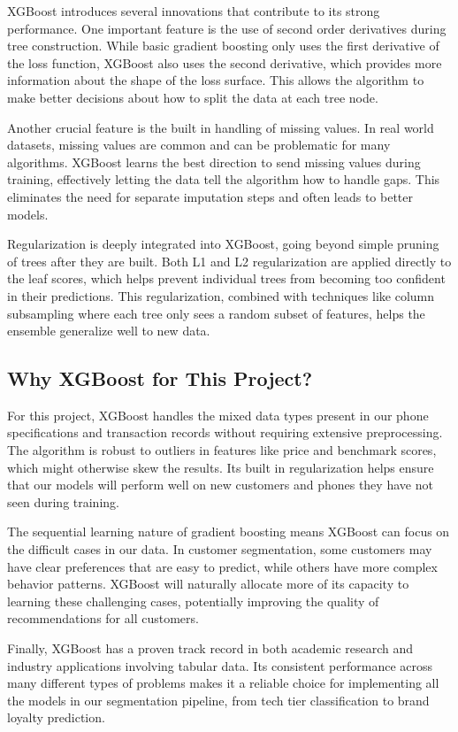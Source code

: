 \documentclass[12pt, a4paper]{report}
\numberwithin{equation}{chapter}
\begin{document}
XGBoost introduces several innovations that contribute to its strong performance. One important feature is the use of second order derivatives during tree construction. While basic gradient boosting only uses the first derivative of the loss function, XGBoost also uses the second derivative, which provides more information about the shape of the loss surface. This allows the algorithm to make better decisions about how to split the data at each tree node.

Another crucial feature is the built in handling of missing values. In real world datasets, missing values are common and can be problematic for many algorithms. XGBoost learns the best direction to send missing values during training, effectively letting the data tell the algorithm how to handle gaps. This eliminates the need for separate imputation steps and often leads to better models.

Regularization is deeply integrated into XGBoost, going beyond simple pruning of trees after they are built. Both L1 and L2 regularization are applied directly to the leaf scores, which helps prevent individual trees from becoming too confident in their predictions. This regularization, combined with techniques like column subsampling where each tree only sees a random subset of features, helps the ensemble generalize well to new data.

\subsection{Why XGBoost for This Project?}

For this project, XGBoost handles the mixed data types present in our phone specifications and transaction records without requiring extensive preprocessing. The algorithm is robust to outliers in features like price and benchmark scores, which might otherwise skew the results. Its built in regularization helps ensure that our models will perform well on new customers and phones they have not seen during training.

The sequential learning nature of gradient boosting means XGBoost can focus on the difficult cases in our data. In customer segmentation, some customers may have clear preferences that are easy to predict, while others have more complex behavior patterns. XGBoost will naturally allocate more of its capacity to learning these challenging cases, potentially improving the quality of recommendations for all customers.

Finally, XGBoost has a proven track record in both academic research and industry applications involving tabular data. Its consistent performance across many different types of problems makes it a reliable choice for implementing all the models in our segmentation pipeline, from tech tier classification to brand loyalty prediction.
\end{document}
